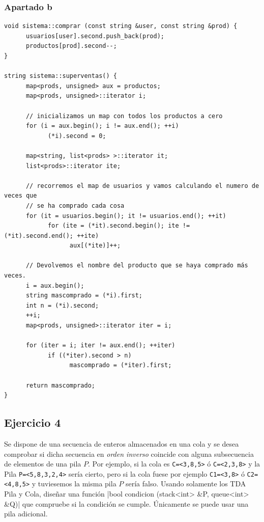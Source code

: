 \documentclass[10pt,a4paper,spanish]{report}
\begin{document}
\subsubsection{\textcolor[rgb]{0.5,0.8,1}Apartado b}
\begin{verbatim}
void sistema::comprar (const string &user, const string &prod) {
      usuarios[user].second.push_back(prod);
      productos[prod].second--;
}

string sistema::superventas() {
      map<prods, unsigned> aux = productos;
      map<prods, unsigned>::iterator i;

      // inicializamos un map con todos los productos a cero
      for (i = aux.begin(); i != aux.end(); ++i)
            (*i).second = 0;

      map<string, list<prods> >::iterator it;
      list<prods>::iterator ite;

      // recorremos el map de usuarios y vamos calculando el numero de veces que 
      // se ha comprado cada cosa
      for (it = usuarios.begin(); it != usuarios.end(); ++it)
            for (ite = (*it).second.begin(); ite != (*it).second.end(); ++ite)
                  aux[(*ite)]++;

      // Devolvemos el nombre del producto que se haya comprado más veces.
      i = aux.begin();
      string mascomprado = (*i).first;
      int n = (*i).second;
      ++i;
      map<prods, unsigned>::iterator iter = i;

      for (iter = i; iter != aux.end(); ++iter)
            if ((*iter).second > n)
                  mascomprado = (*iter).first;

      return mascomprado;
}
\end{verbatim}

\subsection{\textcolor[rgb]{0.5,0.8,1}Ejercicio 4}
\noindent
Se dispone de una secuencia de enteros almacenados en una cola y se desea comprobar si dicha secuencia en \textit{orden inverso} coincide con alguna subsecuencia de elementos de una pila $P$. Por ejemplo, si la cola es \verb*|C=<3,8,5>| ó \verb*|C=<2,3,8>| y la Pila \verb*|P=<5,8,3,2,4>| sería cierto, pero si la cola fuese por ejemplo \verb*|C1=<3,8>| ó \verb*|C2=<4,8,5>| y tuviesemos la misma pila $P$ sería falso. Usando solamente los TDA Pila y Cola, diseñar una función |bool condicion (stack<int> &P, queue<int> &Q)| que compruebe si la condición se cumple. Únicamente se puede usar una pila adicional.
\end{document}
